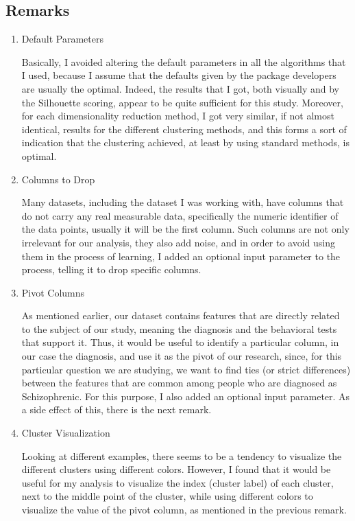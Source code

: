 \documentclass{article}
\begin{document}
\subsection{Remarks}
\begin{enumerate}
    \item Default Parameters
    
    Basically, I avoided altering the default parameters in all the algorithms that I used, because I assume that the defaults given by the package developers are usually the optimal. Indeed, the results that I got, both visually and by the Silhouette scoring, appear to be quite sufficient for this study. Moreover, for each dimensionality reduction method, I got very similar, if not almost identical, results for the different clustering methods, and this forms a sort of indication that the clustering achieved, at least by using standard methods, is optimal. 
    
    \item Columns to Drop

    Many datasets, including the dataset I was working with, have columns that do not carry any real measurable data, specifically the numeric identifier of the data points, usually it will be the first column. Such columns are not only irrelevant for our analysis, they also add noise, and in order to avoid using them in the process of learning, I added an optional input parameter to the process, telling it to drop specific columns.
    \item Pivot Columns

    As mentioned earlier, our dataset contains features that are directly related to the subject of our study, meaning the diagnosis and the behavioral tests that support it. Thus, it would be useful to identify a particular column, in our case the diagnosis, and use it as the pivot of our research, since, for this particular question we are studying, we want to find ties (or strict differences) between the features that are common among people who are diagnosed as Schizophrenic. For this purpose, I also added an optional input parameter. As a side effect of this, there is the next remark.

    \item Cluster Visualization

    Looking at different examples, there seems to be a tendency to visualize the different clusters using different colors. However, I found that it would be useful for my analysis to visualize the index (cluster label) of each cluster, next to the middle point of the cluster, while using different colors to visualize the value of the pivot column, as mentioned in the previous remark.


\end{enumerate}
\end{document}
